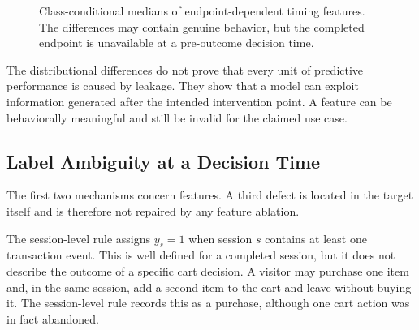 \documentclass[conference, letterpaper]{IEEEtran}
\begin{document}
\begin{figure}[t]
\centering
{}
\caption{Class-conditional medians of endpoint-dependent timing features. The differences may contain genuine behavior, but the completed endpoint is unavailable at a pre-outcome decision time.}
\label{fig:timing}
\end{figure}

The distributional differences do not prove that every unit of predictive performance is caused by leakage. They show that a model can exploit information generated after the intended intervention point. A feature can be behaviorally meaningful and still be invalid for the claimed use case.

\subsection{Label Ambiguity at a Decision Time}
\label{sec:labelamb}
The first two mechanisms concern features. A third defect is located in the target itself and is therefore not repaired by any feature ablation.

The session-level rule assigns $y_s = 1$ when session $s$ contains at least one transaction event. This is well defined for a completed session, but it does not describe the outcome of a specific cart decision. A visitor may purchase one item and, in the same session, add a second item to the cart and leave without buying it. The session-level rule records this as a purchase, although one cart action was in fact abandoned.
\end{document}

